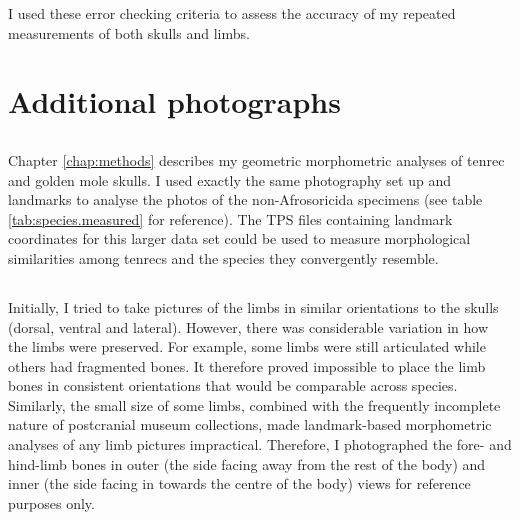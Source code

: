 	I used these error checking criteria to assess the accuracy of my repeated measurements of both skulls and limbs. 

\section{Additional photographs}
	\subsection{}
	Chapter \ref{chap:methods} describes my geometric morphometric analyses of tenrec and golden mole skulls. I used exactly the same photography set up and landmarks to analyse the photos of the non-Afrosoricida specimens (see table \ref{tab:species.measured} for reference). The TPS files containing landmark coordinates for this larger data set could be used  to measure morphological similarities among tenrecs and the species they convergently resemble. %
		
	\subsection{}
	Initially, I tried to take pictures of the limbs in similar orientations to the skulls (dorsal, ventral and lateral). However, there was considerable variation in how the limbs were preserved. For example, some limbs were still articulated while others had fragmented bones. It therefore proved impossible to place the limb bones in consistent orientations that would be comparable across species. Similarly, the small size of some limbs, combined with the frequently incomplete nature of postcranial museum collections, made landmark-based morphometric analyses of any limb pictures impractical. Therefore, I photographed the fore- and hind-limb bones in outer (the side facing away from the rest of the body) and inner (the side facing in towards the centre of the body) views for reference purposes only.	
	
